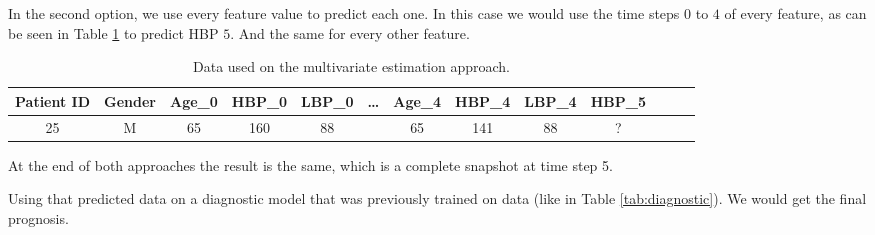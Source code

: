 In the second option, we use every feature value to predict each one. In this case we would use the time steps $0$ to $4$ of every feature, as can be seen in Table \ref{tab:approach2} to predict HBP $5$. And the same for every other feature.

\begin{table}[h]
	
	\begin{center}
		\begin{tabular}{ccccccccccccc}
			\textbf{Patient ID} & \textbf{Gender} & \textbf{Age\_0} & \textbf{HBP\_0} & \textbf{LBP\_0} & \textbf{…} & \textbf{Age\_4} & \textbf{HBP\_4} & \textbf{LBP\_4} & \textbf{HBP\_5} \\ \hline
			25                  & M               & 65              & 160             & 88      &            & 65              & 141             & 88              & ?              \\ \hline
		\end{tabular}
		\caption{Data used on the multivariate estimation approach.}
		\label{tab:approach2}
	\end{center}
\end{table}

At the end of both approaches the result is the same, which is a complete snapshot at time step 5.

Using that predicted data on a diagnostic model that was previously trained on data (like in Table \ref{tab:diagnostic}).
We would get the final prognosis.

\cleardoublepage